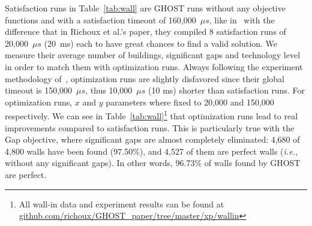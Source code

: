 \documentclass[journal]{IEEEtran}
\newcommand{\ghost}{\textsc{GHOST}\xspace}
\newcommand{\ie}{\textit{i.e.}}
\begin{document}
% 
Satisfaction runs in Table~\ref{tab:wall}  are \ghost runs without any
objective functions  and with  a satisfaction  timeout of  160,000~$\mu s$, like
in~\cite{RichouxUO14}  with the  difference that  in Richoux  et al.'s
paper, they  compiled 8 satisfaction runs  of 20,000~$\mu s$ (20~ms) each to  have great
chances to find  a valid solution. We measure their  average number of
buildings, significant  gaps and  technology level  in order  to match
them  with   optimization  runs.   Always  following   the  experiment
methodology  of~\cite{RichouxUO14},  optimization  runs  are  slightly
disfavored since their global timeout is 150,000~$\mu s$, thus 10,000~$\mu s$ (10 ms) shorter than satisfaction
runs. For optimization  runs, $x$ and $y$ parameters where
fixed   to    20,000   and   150,000    respectively.    We   can    see   in
Table~\ref{tab:wall}\footnote{All wall-in data  and experiment results
  can                   be                  found                   at
  \href{https://github.com/richoux/GHOST\_paper/tree/master/xp/wallin}{github.com/richoux/GHOST\_paper/tree/master/xp/wallin}}
that  optimization  runs  lead   to  real  improvements  compared  to
satisfaction runs. This  is particularly true with  the Gap objective,
where significant  gaps are  almost completely eliminated:
 4,680 of 4,800 walls have been found (97.50\%), and 4,527 of them
are perfect walls (\ie, without any significant gaps). In other words,
96.73\% of walls found by \ghost are perfect.
\end{document}
